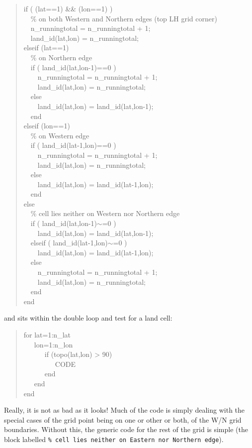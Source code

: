 \documentclass{tufte-book} %
\newenvironment{docspec}{\begin{quotation}\ttfamily\parskip0pt\parindent0pt\ignorespaces}{\end{quotation}}
\begin{document}
\begin{docspec}
if ( (lat==1) \&\& (lon==1) )
\\ \ \ \% on both Western and Northern edges (top LH grid corner)
\\ \ \ n\_runningtotal = n\_runningtotal + 1;
\\ \ \ land\_id(lat,lon) = n\_runningtotal;
\\elseif (lat==1)
\\ \ \ \% on Northern edge
\\ \ \ if ( land\_id(lat,lon-1)==0 )
\\ \ \ \ \ n\_runningtotal = n\_runningtotal + 1;
\\ \ \ \ \ land\_id(lat,lon) = n\_runningtotal;
\\ \ \ else
\\ \ \ \ \ land\_id(lat,lon) = land\_id(lat,lon-1); 
\\ \ \ end
\\elseif (lon==1)
\\ \ \ \% on Western edge
\\ \ \ if ( land\_id(lat-1,lon)==0 )
\\ \ \ \ \ n\_runningtotal = n\_runningtotal + 1;
\\ \ \ \ \ land\_id(lat,lon) = n\_runningtotal;
\\ \ \ else
\\ \ \ \ \ land\_id(lat,lon) = land\_id(lat-1,lon); 
\\ \ \ end
\\else
\\ \ \ \% cell lies neither on Western nor Northern edge
\\ \ \ if ( land\_id(lat,lon-1)\(\sim\)=0 )
\\ \ \ \ \ land\_id(lat,lon) = land\_id(lat,lon-1);
\\ \ \ elseif ( land\_id(lat-1,lon)\(\sim\)=0 )
\\ \ \ \ \ land\_id(lat,lon) = land\_id(lat-1,lon);
\\ \ \ else
\\ \ \ \ \ n\_runningtotal = n\_runningtotal + 1;
\\ \ \ \ \ land\_id(lat,lon) = n\_runningtotal;
\\ \ \ end
\\end
\end{docspec}
and sits within the double loop and test for a land cell:
\begin{docspec}
for lat=1:n\_lat
\\ \ \ \ lon=1:n\_lon
\\ \ \ \ \ \ \ if (topo(lat,lon) > 90)
\\ \ \ \ \ \ \ \ \ \ CODE
\\ \ \ \ \ \ \ end
\\ \ \ \ end
\\end
\end{docspec}
Really, it is not as bad as it looks! Much of the code is simply dealing with the special cases of the grid point being on one or other or both, of the W/N grid boundaries. Without this, the generic code for the rest of the grid is simple (the block labelled \texttt{\% cell lies neither on Eastern nor Northern edge}).
\end{document}
